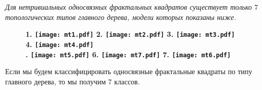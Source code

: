 \documentclass[a5paper,9pt,twoside]{extarticle} %
\begin{document}
{\em Для нетривиальных односвязных фрактальных квадратов существует только $7$ топологических типов главного дерева, модели которых показаны ниже.}
\begin{figure}[H]
\centering \Large {\bf
1. \texttt{[image: mt1.pdf]}
\hfill
2. \texttt{[image: mt2.pdf]}
\hfill
3. \texttt{[image: mt3.pdf]}
\hfill
4. \texttt{[image: mt4.pdf]}\\
. \texttt{[image: mt5.pdf]}
\hfill
6. \texttt{[image: mt7.pdf]}
\hfill
7. \texttt{[image: mt6.pdf]}}
\end{figure}

Если мы будем классифицировать односвязные фрактальные квадраты по типу главного дерева, то мы получим 7 классов.

\end{document}
